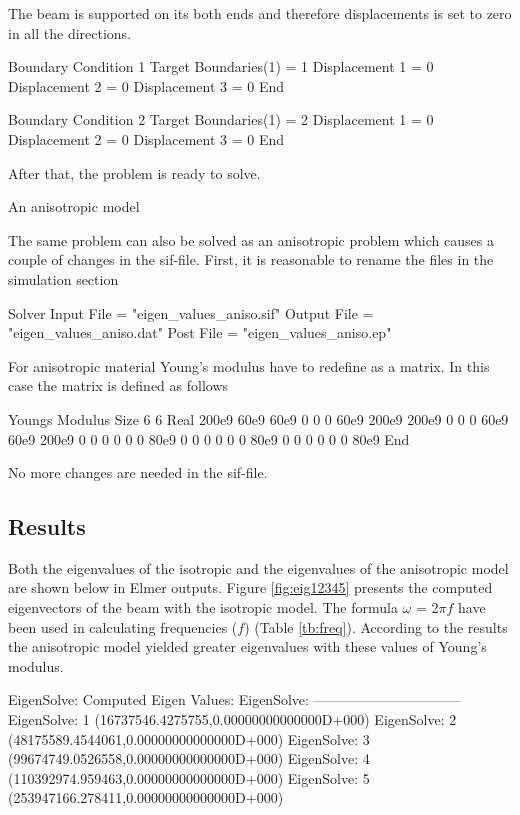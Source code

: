 \begin{flushleft}
The beam is supported on its both ends and therefore displacements is set to zero in all the directions.

\ttbegin  
Boundary Condition 1
  Target Boundaries(1) = 1
  Displacement 1 = 0
  Displacement 2 = 0
  Displacement 3 = 0  
End

Boundary Condition 2
  Target Boundaries(1) = 2
  Displacement 1 = 0
  Displacement 2 = 0
  Displacement 3 = 0  
End
\ttend  

After that, the problem is ready to solve.
\linebreak[4]

\begin{bf}
An anisotropic model
\end{bf}
\linebreak[2]

The same problem can also be solved as an anisotropic problem
which causes a couple of changes in the sif-file.
First, it is reasonable to rename the files in the simulation section

\ttbegin
Solver Input File = "eigen_values_aniso.sif"
Output File = "eigen_values_aniso.dat"
Post File = "eigen_values_aniso.ep"
\ttend

For anisotropic material Young's modulus have to redefine as a matrix. 
In this case the matrix is defined as follows

\ttbegin
Youngs Modulus
Size 6 6
    Real  200e9  60e9   60e9   0     0     0      
          60e9   200e9  200e9  0     0     0      
          60e9   60e9   200e9  0     0     0      
          0      0      0      80e9  0     0      
          0      0      0      0     80e9  0      
          0      0      0      0     0     80e9   
    End
\ttend

No more changes are needed in the sif-file.

\end{flushleft}
\subsection*{Results}
Both the eigenvalues of the isotropic and the eigenvalues of the anisotropic model are shown below in Elmer outputs. Figure \ref{fig:eig12345} presents the computed eigenvectors of the beam with the isotropic model. The formula $\omega$ = 2$\pi$$f$ have been used in calculating frequencies ($f$)
(Table \ref{tb:freq}).
According to the results the anisotropic model yielded greater eigenvalues with
these values of Young's modulus.  


\ttbegin
EigenSolve: Computed Eigen Values:
EigenSolve: --------------------------------
EigenSolve:            1        (16737546.4275755,0.00000000000000D+000)
EigenSolve:            2        (48175589.4544061,0.00000000000000D+000)
EigenSolve:            3        (99674749.0526558,0.00000000000000D+000)
EigenSolve:            4        (110392974.959463,0.00000000000000D+000)
EigenSolve:            5        (253947166.278411,0.00000000000000D+000)

